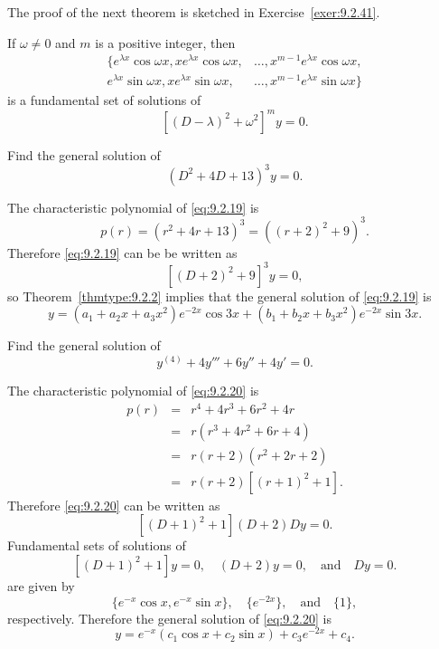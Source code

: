\documentclass{ximera}
\begin{document}
The proof of the next theorem is sketched in
Exercise~\ref{exer:9.2.41}.

\begin{theorem}\label{thmtype:9.2.2}
If $\omega \neq 0$ and $m$ is a positive integer, then
$$
\begin{array}{rl}
\{e^{\lambda x}\cos\omega x, xe^{\lambda x}\cos\omega x,
&\dots, x^{m-1}e^{\lambda x}\cos\omega x,\\
e^{\lambda x}\sin\omega x, xe^{\lambda x}\sin\omega x,&
\dots, x^{m-1}e^{\lambda x}\sin\omega x\}
\end{array}
$$
is a fundamental set of solutions of
$$
[(D-\lambda)^2+\omega^2]^my=0.
$$
\end{theorem}

\begin{example}\label{example:9.2.6}
Find the general solution of
\begin{equation} \label{eq:9.2.19}
(D^2+4D+13)^3y=0.
\end{equation}


\begin{explanation}  The characteristic polynomial of \eqref{eq:9.2.19} is
$$
p(r)=(r^2+4r+13)^3=\left((r+2)^2+9\right)^3.
$$
Therefore \eqref{eq:9.2.19} can be be written as
$$
[(D+2)^2+9]^3y=0,
$$
so Theorem~\ref{thmtype:9.2.2} implies that the general solution of
\eqref{eq:9.2.19} is
$$
y=(a_1+a_2x+a_3x^2)e^{-2x}\cos3x
+(b_1+b_2x+b_3x^2)e^{-2x}\sin3x.
$$
\end{explanation}
\end{example}

\begin{example}\label{example:9.2.7}
Find the general solution of
\begin{equation} \label{eq:9.2.20}
y^{(4)}+4y'''+6y''+4y'=0.
\end{equation}


\begin{explanation}  The characteristic polynomial of \eqref{eq:9.2.20} is
\begin{eqnarray*}
p(r)&=&r^4+4r^3+6r^2+4r\\
&=&r(r^3+4r^2+6r+4)\\
&=&r(r+2)(r^2+2r+2)\\
&=&r(r+2)[(r+1)^2+1].
\end{eqnarray*}
Therefore \eqref{eq:9.2.20} can be written as
$$
[(D+1)^2+1](D+2)Dy=0.
$$
Fundamental sets of solutions of
$$
\left[(D+1)^2+1\right] y=0,\quad (D+2) y=0,\quad\mbox{and}\quad Dy=0.
$$
are given by
$$
\{e^{-x}\cos x,e^{-x}\sin x\},\quad \{e^{-2x}\},\quad\mbox{and}\quad \{1\},
$$
respectively. Therefore the general solution of \eqref{eq:9.2.20} is
$$
y=e^{-x}(c_1\cos x+c_2\sin x)+c_3e^{-2x}+c_4.
$$
\end{explanation}
\end{example}
\end{document}
